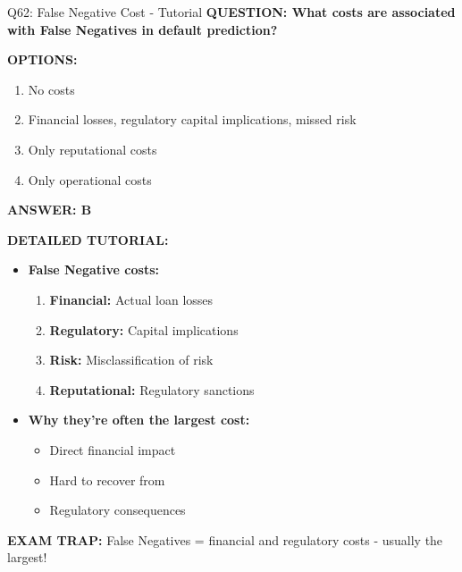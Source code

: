 \documentclass[8pt]{beamer}
\begin{document}
	
	\begin{frame}{Q62: False Negative Cost - Tutorial}
		\fontsize{6.5}{7.5}\selectfont
		\textbf{QUESTION: What costs are associated with False Negatives in default prediction?}
		
		\vspace{0.1cm}
		\textbf{OPTIONS:}
		\begin{enumerate}
			\item No costs
			\item Financial losses, regulatory capital implications, missed risk
			\item Only reputational costs
			\item Only operational costs
		\end{enumerate}
		
		\vspace{0.1cm}
		\textcolor{myblue}{\textbf{ANSWER: B}}
		
		\vspace{0.1cm}
		\textbf{DETAILED TUTORIAL:}
		\begin{itemize}
			\item \textbf{False Negative costs:}
			\begin{enumerate}
				\item \textbf{Financial:} Actual loan losses
				\item \textbf{Regulatory:} Capital implications
				\item \textbf{Risk:} Misclassification of risk
				\item \textbf{Reputational:} Regulatory sanctions
			\end{enumerate}
			\item \textbf{Why they're often the largest cost:}
			\begin{itemize}
				\item Direct financial impact
				\item Hard to recover from
				\item Regulatory consequences
			\end{itemize}
		\end{itemize}
		
		\textcolor{myred}{\textbf{EXAM TRAP:}} False Negatives = \textcolor{myblue}{financial and regulatory costs} - usually the largest!
	\end{frame}
	
\end{document}
